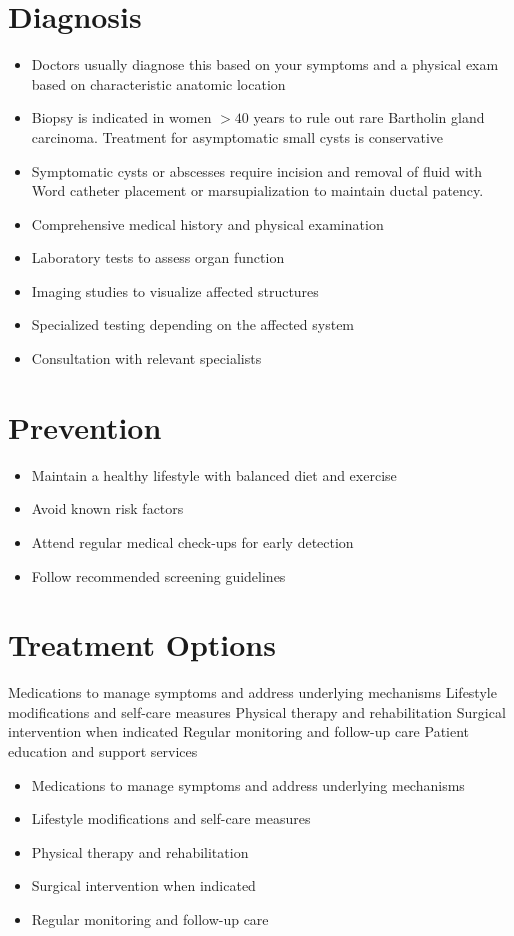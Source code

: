 \section{Diagnosis}
\begin{itemize}[noitemsep]
  \item Doctors usually diagnose this based on your symptoms and a physical exam based on characteristic anatomic location
  \item Biopsy is indicated in women $>40$ years to rule out rare Bartholin gland carcinoma. Treatment for asymptomatic small cysts is conservative
  \item Symptomatic cysts or abscesses require incision and removal of fluid with Word catheter placement or marsupialization to maintain ductal patency.
  \item Comprehensive medical history and physical examination
  \item Laboratory tests to assess organ function
  \item Imaging studies to visualize affected structures
  \item Specialized testing depending on the affected system
  \item Consultation with relevant specialists
\end{itemize}
\section{Prevention}
\begin{itemize}[noitemsep]
  \item Maintain a healthy lifestyle with balanced diet and exercise
  \item Avoid known risk factors
  \item Attend regular medical check-ups for early detection
  \item Follow recommended screening guidelines
\end{itemize}
\section{Treatment Options}
Medications to manage symptoms and address underlying mechanisms Lifestyle modifications and self-care measures Physical therapy and rehabilitation Surgical intervention when indicated Regular monitoring and follow-up care Patient education and support services

\begin{itemize}[noitemsep]
  \item Medications to manage symptoms and address underlying mechanisms
  \item Lifestyle modifications and self-care measures
  \item Physical therapy and rehabilitation
  \item Surgical intervention when indicated
  \item Regular monitoring and follow-up care
\end{itemize}
